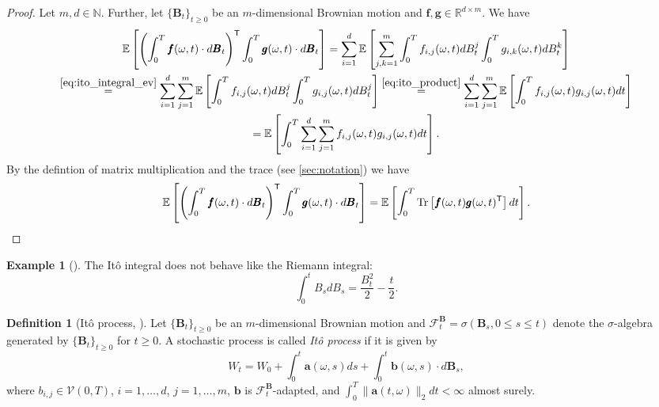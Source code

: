 \documentclass[12pt]{article}
\theoremstyle{definition}
\newtheorem{example}[example]{Example}
\newtheorem{definition}[definition]{Definition}
\numberwithin{equation}{section}
\newcommand{\N}{\mathbb{N}}
\newcommand{\R}{\mathbb{R}}
\newcommand{\CF}{\mathcal{F}}
\newcommand{\CV}{\mathcal{V}}
\newcommand{\T}{\mathsf{T}}
\newcommand{\ev}[1]{\mathbb{E}\left[{#1}\right]}
\newcommand{\norm}[1]{\lVert{#1}\rVert_2}
\DeclareMathOperator{\Tr}{Tr}
\begin{document}
\begin{proof}
  Let $m,d \in \N$. Further, let $\{\pmb{B}_t\}_{t\geq0}$ be an $m$-dimensional Brownian motion and $\pmb{f},\pmb{g}  \in \R^{d \times m}$. We have
\begin{multline*}
  \ev{\left(\int_0^T \pmb{f}(\omega, t)\cdot d\pmb{B}_t\right)^\mathsf{T}\int_0^T \pmb{g}(\omega, t)\cdot d\pmb{B}_t}
     = \sum_{i=1}^d \ev{\sum_{j,k=1}^m \int_0^T f_{i,j}(\omega, t)dB_t^j\int_0^T g_{i,k}(\omega, t)dB_t^k}\\
    \overset{\eqref{eq:ito_integral_ev}}{=} \sum_{i=1}^d \sum_{j=1}^m \ev{\int_0^T f_{i,j}(\omega, t)dB_t^j\int_0^T g_{i,j}(\omega, t)dB_t^j} 
    \overset{\eqref{eq:ito_product}}{=} \sum_{i=1}^d \sum_{j=1}^m \ev{\int_0^T f_{i,j}(\omega, t)g_{i,j}(\omega, t)dt} \\
    = \ev{\int_0^T \sum_{i=1}^d \sum_{j=1}^m f_{i,j}(\omega, t)g_{i,j}(\omega, t)dt}.
\end{multline*}
By the defintion of matrix multiplication and the trace (see \autoref{sec:notation}) we have 
\begin{equation*}
    \ev{\left(\int_0^T \pmb{f}(\omega, t)\cdot d\pmb{B}_t\right)^\mathsf{T}\int_0^T \pmb{g}(\omega, t)\cdot d\pmb{B}_t}
    = \ev{\int_0^T \Tr\left[\pmb{f}(\omega, t)\pmb{g}(\omega, t)^\T\right]dt}. \qedhere
\end{equation*}
\end{proof}
\begin{example}[]
  The Itô integral does not behave like the Riemann integral:
  \begin{equation*}
    \int_0^t B_s dB_s = \frac{B_t^2}{2} - \frac{t}{2}.
  \end{equation*}
\end{example}
\begin{definition}[Itô process, ]
  Let $\{\mathbf{B}_t\}_{t\geq 0}$ be an $m$-dimensional Brownian motion and $\CF_t^\mathbf{B} = \sigma(\mathbf{B}_s, 0 \leq s \leq t)$ denote the $\sigma$-algebra generated by $\{\mathbf{B}_t\}_{t\geq 0}$ for $t \geq 0$. A stochastic process is called \emph{Itô process} if it is given by
  \begin{equation}
    \label{eq:ito_process}
    W_t = W_0 + \int_0^t\mathbf{a}(\omega,s)ds + \int_0^t \mathbf{b}( \omega,s)\cdot d\mathbf{B}_s,
  \end{equation}
  where $b_{i,j} \in \CV(0,T)$, $i=1,\dots,d$, $j=1,\dots,m$, $\mathbf{b}$ is $\CF_t^\mathbf{B}$-adapted, and $\int_0^T \norm{\mathbf{a}(t, \omega)}dt < \infty$ almost surely.
\end{definition}
\end{document}
